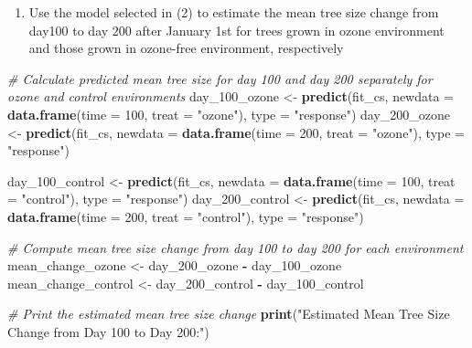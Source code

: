 \documentclass[
]{article}
\newenvironment{Shaded}{\begin{snugshade}}{\end{snugshade}}
\newcommand{\AttributeTok}[1]{\textcolor[rgb]{0.13,0.29,0.53}{#1}}
\newcommand{\CommentTok}[1]{\textcolor[rgb]{0.56,0.35,0.01}{\textit{#1}}}
\newcommand{\DecValTok}[1]{\textcolor[rgb]{0.00,0.00,0.81}{#1}}
\newcommand{\FunctionTok}[1]{\textcolor[rgb]{0.13,0.29,0.53}{\textbf{#1}}}
\newcommand{\NormalTok}[1]{#1}
\newcommand{\OtherTok}[1]{\textcolor[rgb]{0.56,0.35,0.01}{#1}}
\newcommand{\SpecialCharTok}[1]{\textcolor[rgb]{0.81,0.36,0.00}{\textbf{#1}}}
\newcommand{\StringTok}[1]{\textcolor[rgb]{0.31,0.60,0.02}{#1}}
\providecommand{\tightlist}{%
  \setlength{\itemsep}{0pt}\setlength{\parskip}{0pt}}
\begin{document}
\begin{enumerate}
\def\labelenumi{\arabic{enumi}.}
\setcounter{enumi}{3}
\tightlist
\item
  Use the model selected in (2) to estimate the mean tree size change
  from day100 to day 200 after January 1st for trees grown in ozone
  environment and those grown in ozone-free environment, respectively
\end{enumerate}

\begin{Shaded}
\begin{Highlighting}[]
\CommentTok{\# Calculate predicted mean tree size for day 100 and day 200 separately for ozone and control environments}
\NormalTok{day\_100\_ozone }\OtherTok{\textless{}{-}} \FunctionTok{predict}\NormalTok{(fit\_cs, }\AttributeTok{newdata =} \FunctionTok{data.frame}\NormalTok{(}\AttributeTok{time =} \DecValTok{100}\NormalTok{, }\AttributeTok{treat =} \StringTok{"ozone"}\NormalTok{), }\AttributeTok{type =} \StringTok{"response"}\NormalTok{)}
\NormalTok{day\_200\_ozone }\OtherTok{\textless{}{-}} \FunctionTok{predict}\NormalTok{(fit\_cs, }\AttributeTok{newdata =} \FunctionTok{data.frame}\NormalTok{(}\AttributeTok{time =} \DecValTok{200}\NormalTok{, }\AttributeTok{treat =} \StringTok{"ozone"}\NormalTok{), }\AttributeTok{type =} \StringTok{"response"}\NormalTok{)}

\NormalTok{day\_100\_control }\OtherTok{\textless{}{-}} \FunctionTok{predict}\NormalTok{(fit\_cs, }\AttributeTok{newdata =} \FunctionTok{data.frame}\NormalTok{(}\AttributeTok{time =} \DecValTok{100}\NormalTok{, }\AttributeTok{treat =} \StringTok{"control"}\NormalTok{), }\AttributeTok{type =} \StringTok{"response"}\NormalTok{)}
\NormalTok{day\_200\_control }\OtherTok{\textless{}{-}} \FunctionTok{predict}\NormalTok{(fit\_cs, }\AttributeTok{newdata =} \FunctionTok{data.frame}\NormalTok{(}\AttributeTok{time =} \DecValTok{200}\NormalTok{, }\AttributeTok{treat =} \StringTok{"control"}\NormalTok{), }\AttributeTok{type =} \StringTok{"response"}\NormalTok{)}

\CommentTok{\# Compute mean tree size change from day 100 to day 200 for each environment}
\NormalTok{mean\_change\_ozone }\OtherTok{\textless{}{-}}\NormalTok{ day\_200\_ozone }\SpecialCharTok{{-}}\NormalTok{ day\_100\_ozone}
\NormalTok{mean\_change\_control }\OtherTok{\textless{}{-}}\NormalTok{ day\_200\_control }\SpecialCharTok{{-}}\NormalTok{ day\_100\_control}

\CommentTok{\# Print the estimated mean tree size change}
\FunctionTok{print}\NormalTok{(}\StringTok{"Estimated Mean Tree Size Change from Day 100 to Day 200:"}\NormalTok{)}
\end{Highlighting}
\end{Shaded}
\end{document}
